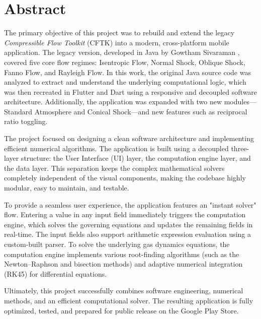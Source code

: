 \chapter*{Abstract}

\vspace{1cm}

\begin{justify}

The primary objective of this project was to rebuild and extend the legacy \textit{Compressible Flow Toolkit} (CFTK) into a modern, cross-platform mobile application. The legacy version, developed in Java by Gowtham Sivaraman \cite{sivaraman2015}, covered five core flow regimes: Isentropic Flow, Normal Shock, Oblique Shock, Fanno Flow, and Rayleigh Flow. In this work, the original Java source code was analyzed to extract and understand the underlying computational logic, which was then recreated in Flutter and Dart using a responsive and decoupled software architecture. Additionally, the application was expanded with two new modules—Standard Atmosphere and Conical Shock—and new features such as reciprocal ratio toggling.

The project focused on designing a clean software architecture and implementing efficient numerical algorithms. The application is built using a decoupled three-layer structure: the User Interface (UI) layer, the computation engine layer, and the data layer. This separation keeps the complex mathematical solvers completely independent of the visual components, making the codebase highly modular, easy to maintain, and testable. 

To provide a seamless user experience, the application features an "instant solver" flow. Entering a value in any input field immediately triggers the computation engine, which solves the governing equations and updates the remaining fields in real-time. The input fields also support arithmetic expression evaluation using a custom-built parser. To solve the underlying gas dynamics equations, the computation engine implements various root-finding algorithms (such as the Newton--Raphson and bisection methods) and adaptive numerical integration (RK45) for differential equations.

Ultimately, this project successfully combines software engineering, numerical methods, and an efficient computational solver. The resulting application is fully optimized, tested, and prepared for public release on the Google Play Store.

\end{justify}
